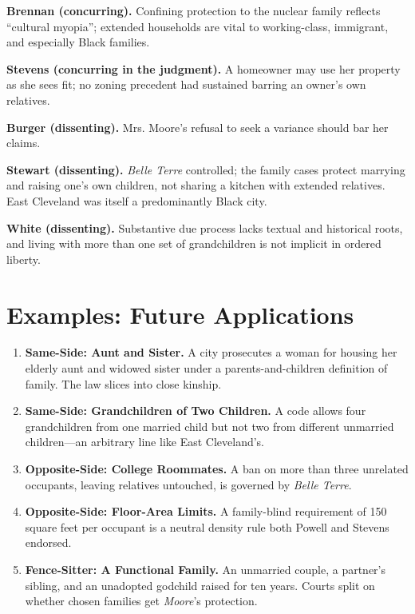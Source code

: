 \documentclass[12pt]{article}
\begin{document}
\textbf{Brennan (concurring).} Confining protection to the nuclear family reflects ``cultural myopia''; extended households are vital to working-class, immigrant, and especially Black families.

\textbf{Stevens (concurring in the judgment).} A homeowner may use her property as she sees fit; no zoning precedent had sustained barring an owner's own relatives.

\textbf{Burger (dissenting).} Mrs. Moore's refusal to seek a variance should bar her claims.

\textbf{Stewart (dissenting).} \textit{Belle Terre} controlled; the family cases protect marrying and raising one's own children, not sharing a kitchen with extended relatives. East Cleveland was itself a predominantly Black city.

\textbf{White (dissenting).} Substantive due process lacks textual and historical roots, and living with more than one set of grandchildren is not implicit in ordered liberty.

\section{Examples: Future Applications}

\begin{enumerate}
\item \textbf{Same-Side: Aunt and Sister.} A city prosecutes a woman for housing her elderly aunt and widowed sister under a parents-and-children definition of family. The law slices into close kinship.
\item \textbf{Same-Side: Grandchildren of Two Children.} A code allows four grandchildren from one married child but not two from different unmarried children---an arbitrary line like East Cleveland's.
\item \textbf{Opposite-Side: College Roommates.} A ban on more than three unrelated occupants, leaving relatives untouched, is governed by \textit{Belle Terre}.
\item \textbf{Opposite-Side: Floor-Area Limits.} A family-blind requirement of 150 square feet per occupant is a neutral density rule both Powell and Stevens endorsed.
\item \textbf{Fence-Sitter: A Functional Family.} An unmarried couple, a partner's sibling, and an unadopted godchild raised for ten years. Courts split on whether chosen families get \textit{Moore}'s protection.
\end{enumerate}
\end{document}
